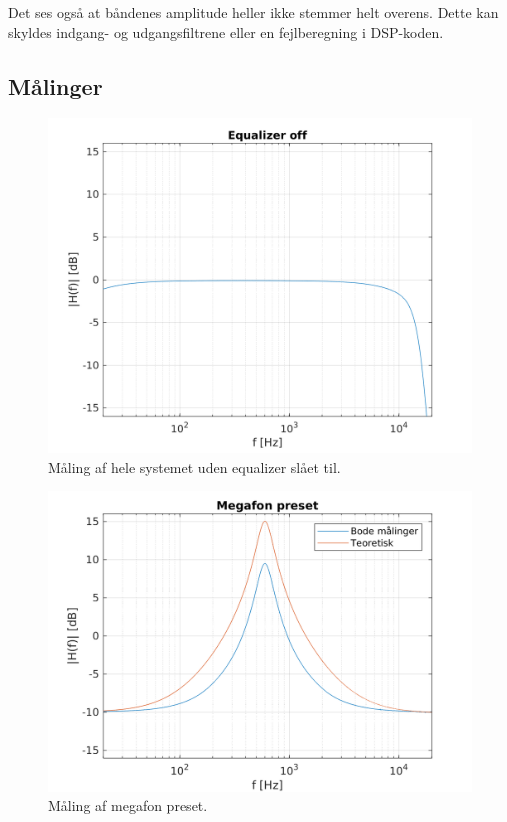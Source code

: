 Det ses også at båndenes amplitude heller ikke stemmer helt overens. Dette kan skyldes indgang- og udgangsfiltrene eller en fejlberegning i DSP-koden. 





\subsection{Målinger}

\begin{figure}[h]
\centering
\includegraphics[]{matlabdemo/test/eq_off.png}  
\caption{Måling af hele systemet uden equalizer slået til.}
\end{figure}

\begin{figure}[h]
\centering
\includegraphics[]{matlabdemo/test/eq_megafon.png}
\caption{Måling af megafon preset.}
\end{figure}

